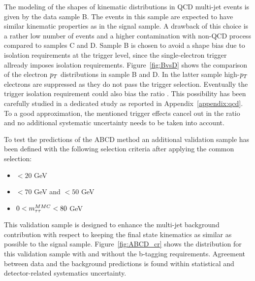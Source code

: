 The modeling of the shapes of kinematic distributions in QCD multi-jet events is given by the data sample B.
The events in this sample are expected to have similar kinematic properties as in  the signal sample.
A drawback of this choice is a rather low number of events and a higher contamination with non-QCD process compared to samples C and D.
Sample B is chosen  to avoid a shape bias due to isolation requirements at the trigger level, since the single-electron trigger 
allready imposes isolation requirements. 
Figure~\ref{fig:BvsD} shows the comparison of the electron $p_{T}$ distributions in sample B and D. In the latter sample 
high-$p_{T}$ electrons are suppressed as they do not pass the trigger selection. 
Eventually the trigger isolation requirement could also 
bias the ratio \rqcd. This possibility has been carefully studied 
in a dedicated study as reported in Appendix~\ref{appendix:qcd}.
To a good approximation, the mentioned trigger effects cancel out in the ratio
\rqcd and no additional systematic uncertainty needs to be taken into account.


To test the predictions of the ABCD method  an additional validation sample has been defined with the following selection criteria after
applying the common selection:
\begin{itemize}
\item \MET $< 20$ GeV
\item \Ht $< 70$ GeV and \SumLtMET$ < 50$ GeV
\item $0 < m_{\tau\tau}^{MMC} < 80$ GeV  	 
\end{itemize}
This validation sample is designed to enhance the multi-jet background contribution with respect to \Ztautau keeping the final 
state kinematics as similar as possible to the signal sample.
Figure~\ref{fig:ABCD_cr} shows the \mmc distribution for this validation sample with and without the  b-tagging requirements.
Agreement between data and the background predictions is found within statistical and detector-related systematics uncertainty. 

